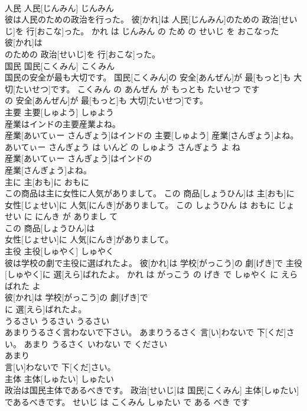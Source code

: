 \documentclass[8pt]{extreport}
\begin{document}
\begin{CJK}{UTF8}{min}
\\	人民	人民[じんみん]	じんみん	
\\	彼は人民のための政治を行った。	彼[かれ]は 人民[じんみん]のための 政治[せいじ]を 行[おこな]った。	かれ は じんみん の ため の せいじ を おこなった	
\\	彼[かれ]は
\\	のための 政治[せいじ]を 行[おこな]った。			
\\	国民	国民[こくみん]	こくみん	
\\	国民の安全が最も大切です。	国民[こくみん]の 安全[あんぜん]が 最[もっと]も 大切[たいせつ]です。	こくみん の あんぜん が もっとも たいせつ です	
\\	の 安全[あんぜん]が 最[もっと]も 大切[たいせつ]です。			
\\	主要	主要[しゅよう]	しゅよう	
\\	産業はインドの主要産業よね。	
\\	産業[あいてぃー さんぎょう]はインドの 主要[しゅよう] 産業[さんぎょう]よね。	あいてぃー さんぎょう は いんど の しゅよう さんぎょう よ ね	
\\	産業[あいてぃー さんぎょう]はインドの
\\	産業[さんぎょう]よね。			
\\	主に	主[おも]に	おもに	
\\	この商品は主に女性に人気がありまして。	この 商品[しょうひん]は 主[おも]に 女性[じょせい]に 人気[にんき]がありまして。	この しょうひん は おもに じょせい に にんき が ありまし て	
\\	この 商品[しょうひん]は
\\	女性[じょせい]に 人気[にんき]がありまして。			
\\	主役	主役[しゅやく]	しゅやく	
\\	彼は学校の劇で主役に選ばれたよ。	彼[かれ]は 学校[がっこう]の 劇[げき]で 主役[しゅやく]に 選[えら]ばれたよ。	かれ は がっこう の げき で しゅやく に えらばれた よ	
\\	彼[かれ]は 学校[がっこう]の 劇[げき]で
\\	に 選[えら]ばれたよ。			
\\	うるさい	うるさい	うるさい	
\\	あまりうるさく言わないで下さい。	あまりうるさく 言[い]わないで 下[くだ]さい。	あまり うるさく いわない で ください	
\\	あまり
\\	言[い]わないで 下[くだ]さい。			
\\	主体	主体[しゅたい]	しゅたい	
\\	政治は国民主体であるべきです。	政治[せいじ]は 国民[こくみん] 主体[しゅたい]であるべきです。	せいじ は こくみん しゅたい で ある べき です	

\end{CJK}
\end{document}
